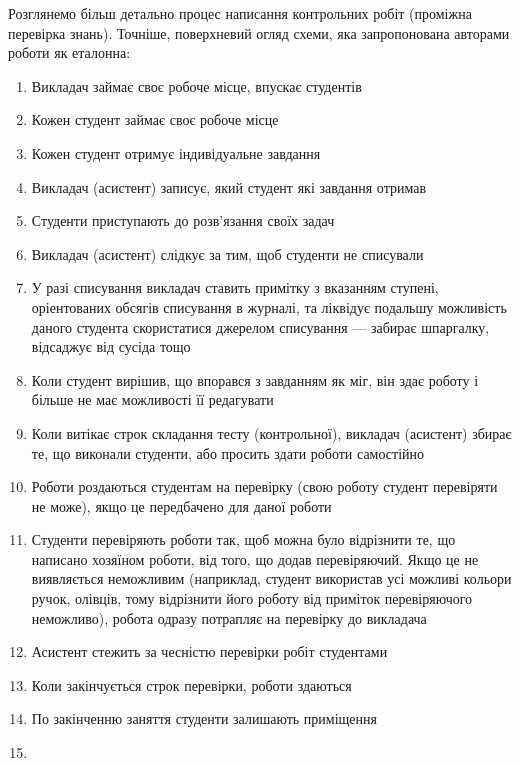 Розглянемо більш детально процес написання контрольних робіт
(проміжна перевірка знань). Точніше, поверхневий огляд схеми, яка запропонована
авторами роботи як еталонна:

\begin{enumerate}
    \item
        Викладач займає своє робоче місце, впускає студентів
    \item
        Кожен студент займає своє робоче місце
    \item
        Кожен студент отримує індивідуальне завдання
    \item
        Викладач (асистент) записує, який студент які завдання отримав
    \item
        Студенти приступають до розв’язання своїх задач
    \item
        Викладач (асистент) слідкує за тим, щоб студенти не списували
    \item
        У разі списування викладач ставить примітку з вказанням ступені,
        оріентованих обсягів списування в журналі, та ліквідує подальшу
        можливість даного студента скористатися джерелом списування --- забирає
        шпаргалку, відсаджує від сусіда тощо
    \item
        Коли студент вирішив, що впорався з завданням як міг, він здає роботу
        і більше не має можливості її редагувати
    \item
        Коли витікає строк складання тесту (контрольної), викладач (асистент)
        збирає те, що виконали студенти, або просить здати роботи самостійно
    \item
        Роботи роздаються студентам на перевірку (свою роботу студент перевіряти
        не може), якщо це передбачено для даної роботи
    \item
        Студенти перевіряють роботи так, щоб можна було відрізнити те, що
        написано хозяїном роботи, від того, що додав перевіряючий. Якщо це не
        виявляється неможливим (наприклад, студент використав усі можливі
        кольори ручок, олівців, тому відрізнити його роботу від приміток
        перевіряючого неможливо), робота одразу потрапляє на перевірку до
        викладача
    \item
        Асистент стежить за чесністю перевірки робіт студентами
    \item
        Коли закінчується строк перевірки, роботи здаються
    \item
        По закінченню заняття студенти залишають приміщення
    \item

\end{enumerate}
